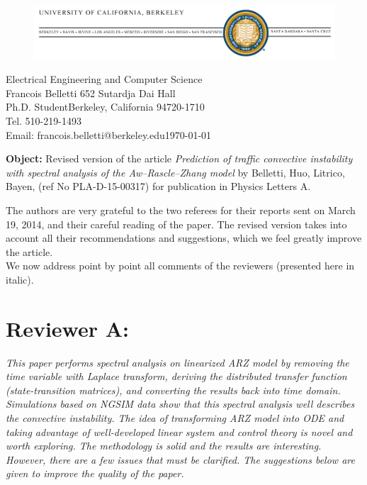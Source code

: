 \documentclass{article}
\begin{document}
\begin{figure}
\includegraphics[width=1\columnwidth]{berkeley-letterhead.jpg}
\end{figure}

\hfill{}Electrical Engineering and Computer Science \\
Francois Belletti \hfill{}652 Sutardja Dai Hall \\
Ph.D. Student\hfill{}\hfill{}Berkeley, California 94720-1710\\
Tel. 510-219-1493 \\
Email: francois.belletti@berkeley.edu\hfill{}\today

\bigskip{}

\bigskip{}
\textbf{Object:} Revised version of the article \textit{Prediction of traffic convective instability with spectral analysis of the Aw--Rascle--Zhang model}
 by Belletti, Huo, Litrico, Bayen, (ref No PLA-D-15-00317) for publication in Physics Letters A.

\bigskip{}

The authors are very grateful to the two referees for their
reports sent on March 19, 2014, and their careful reading of the
paper. The revised version takes into account all their recommendations
and suggestions, which we feel greatly improve the article.\\

We now address point by point all comments of the reviewers (presented
here in italic).

\bigskip{}


\section{Reviewer A:}

\emph{
This paper performs spectral analysis on linearized ARZ model by removing the time variable with Laplace transform, deriving the distributed transfer function (state-transition matrices), and converting the results back into time domain. Simulations based on NGSIM data show that this spectral analysis well describes the convective instability. The idea of transforming ARZ model into ODE and taking advantage of well-developed linear system and control theory is novel and worth exploring. The methodology is solid and the results are interesting. However, there are a few issues that must be clarified. The suggestions below are given to improve the quality of the paper.
}
\end{document}

